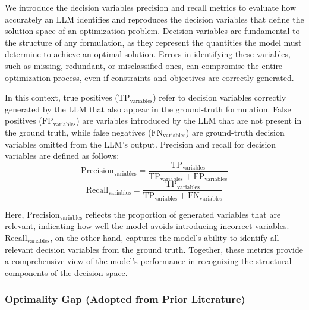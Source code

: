 \documentclass[review,12pt]{elsarticle}
\begin{document}
We introduce the decision variables precision and recall metrics to evaluate how accurately an LLM identifies and reproduces the decision variables that define the solution space of an optimization problem. Decision variables are fundamental to the structure of any formulation, as they represent the quantities the model must determine to achieve an optimal solution. Errors in identifying these variables, such as missing, redundant, or misclassified ones, can compromise the entire optimization process, even if constraints and objectives are correctly generated.

In this context, true positives ($\text{TP}_{\text{variables}}$) refer to decision variables correctly generated by the LLM that also appear in the ground-truth formulation. False positives ($\text{FP}_{\text{variables}}$) are variables introduced by the LLM that are not present in the ground truth, while false negatives ($\text{FN}_{\text{variables}}$) are ground-truth decision variables omitted from the LLM’s output. Precision and recall for decision variables are defined as follows:
\begin{equation}
\text{Precision}_{\text{variables}} = \frac{\text{TP}_{\text{variables}}}{\text{TP}_{\text{variables}} + \text{FP}_{\text{variables}}} 
\label{eq:precision_variables}
\end{equation}
\vspace{-5mm}
\begin{equation}
\text{Recall}_{\text{variables}} = \frac{\text{TP}_{\text{variables}}}{\text{TP}_{\text{variables}} + \text{FN}_{\text{variables}}} 
\label{eq:recall_variables}
\end{equation}

Here, $\text{Precision}_{\text{variables}}$ reflects the proportion of generated variables that are relevant, indicating how well the model avoids introducing incorrect variables. $\text{Recall}_{\text{variables}}$, on the other hand, captures the model’s ability to identify all relevant decision variables from the ground truth. Together, these metrics provide a comprehensive view of the model’s performance in recognizing the structural components of the decision space.

\vspace{-3mm}
\subsubsection{Optimality Gap (Adopted from Prior Literature)}\label{optimality_gap}
\end{document}
